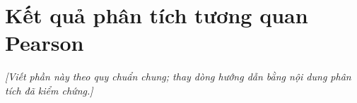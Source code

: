 \section{Kết quả phân tích tương quan Pearson}
\noindent\textit{[Viết phần này theo quy chuẩn chung; thay dòng hướng dẫn bằng nội dung phân tích đã kiểm chứng.]}

